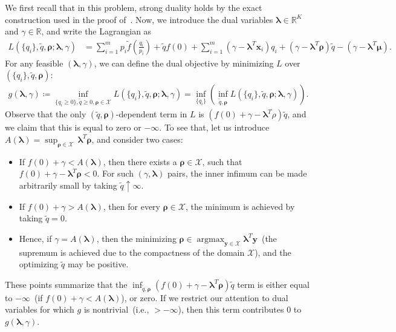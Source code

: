 \documentclass{article}
\theoremstyle{plain}
\theoremstyle{definition}
\DeclareMathOperator*{\argmax}{argmax}
\newcommand{\lrp}[1]{\left( #1 \right)}
\newcommand{\R}{\mathbb{R}}
\newcommand{\calX}{\mathcal X}
\newcommand{\xvec}{\mathbf{x}}
\newcommand{\yvec}{\mathbf{y}}
\newcommand{\qtilde}{\widetilde{q}}
\newcommand{\boldlambda}{\boldsymbol{\lambda}}
\newcommand{\boldmu}{\boldsymbol{\mu}}
\newcommand{\boldrho}{\boldsymbol{\rho}}
\newcommand{\ftilde}{\widetilde{f}}
\begin{document}
    We first recall that in this problem, strong duality holds by the exact construction used in the proof of~. 
    Now, we introduce the dual variables $\boldlambda \in \R^K$ and $\gamma \in \mathbb{R}$, and write the Lagrangian as 
    \begin{align}
        L(\{q_i\}, \qtilde, \boldrho; \boldlambda, \gamma) & = \sum_{i=1}^m p_i \ftilde\lrp{\frac{q_i}{p_i} }  + \qtilde f(0) +  \sum_{i=1}^m (\gamma - \boldlambda^T \xvec_i) q_i + (\gamma - \boldlambda^T \boldrho) \qtilde - (\gamma - \boldlambda^T \boldmu). 
    \end{align}
    For any feasible $(\boldlambda, \gamma)$, we can define the dual objective by minimizing $L$ over $(\{q_i\}, \qtilde, \boldrho)$: 
    \begin{align}
        g(\boldlambda, \gamma) \coloneqq \inf_{\{q_i \geq 0 \}, \qtilde \geq 0, \boldrho \in \calX}  L(\{q_i\}, \qtilde, \boldrho; \boldlambda, \gamma) = \inf_{\{q_i\}} \lrp{  \inf_{\qtilde, \boldrho} L(\{q_i\}, \qtilde, \boldrho; \boldlambda, \gamma)}. 
    \end{align}
    Observe that the only $(\qtilde, \boldrho)$-dependent term in $L$ is $(f(0) + \gamma - \boldlambda^T \rho) \qtilde$, and we claim that this is equal to zero  or $-\infty$. To see that, let us introduce $A(\boldlambda) = \sup_{ \boldrho \in \calX}\,\boldlambda^T \boldrho$, and consider two cases: 
    \begin{itemize}
        \item If $f(0) + \gamma < A(\boldlambda)$, then there exists a $\boldrho \in \calX$, such that $f(0) + \gamma - \boldlambda^T \boldrho < 0$. For such $(\gamma, \boldlambda)$ pairs, the inner infimum can be made arbitrarily small by taking $\qtilde \uparrow \infty$.
        \item If $f(0) + \gamma > A(\boldlambda)$, then for every $\boldrho \in \calX$, the minimum is achieved by taking $\qtilde=0$. 
        \item Hence, if $\gamma = A(\boldlambda)$, then the minimizing $\boldrho \in \argmax_{\yvec \in \calX} \boldlambda^T \yvec$~(the supremum is achieved due to the compactness of the domain $\calX$), and the optimizing $\qtilde$ may be positive.  
    \end{itemize}
    These points summarize that the $\inf_{\qtilde, \boldrho} (f(0) + \gamma - \boldlambda^T \boldrho) \qtilde$ term is either equal to $-\infty$~(if $f(0) + \gamma < A(\boldlambda)$), or zero. If we restrict our attention to dual variables for which $g$ is nontrivial~(i.e., $>-\infty$), then this term contributes $0$ to $g(\boldlambda, \gamma)$. 
\end{document}
